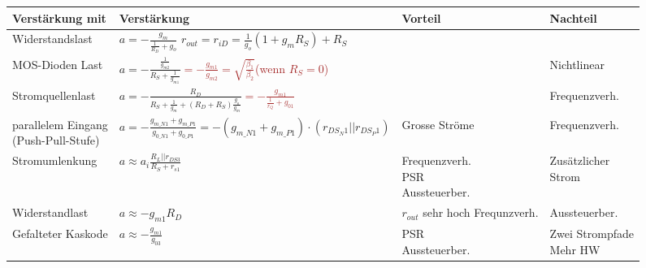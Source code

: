 \begin{tabular}{|l|l|l|l|}
    \hline
    \textbf{Verstärkung mit}  & \textbf{Verstärkung}  & \textbf{Vorteil} & \textbf{Nachteil} \\
    \hline 
    Widerstandslast & \makecell[l]{$a = -\frac{g_m}{\frac{1}{R_D}+g_o}$\\$r_{out} = r_{iD} = \frac{1}{g_o}(1+g_m R_S)+R_S$} & & \\
    \hline
    MOS-Dioden Last & $a = -\frac{\frac{1}{g_{m2}}}{R_S+\frac{1}{g_{m1}}}$\textcolor{brown}{$=-\frac{g_{m1}}{g_{m2}}= \sqrt{\frac{\beta_1}{\beta_2}}$(wenn $R_S = 0$)}& & Nichtlinear \\
    \hline
    Stromquellenlast & $a = -\frac{R_D}{R_S+\frac{1}{g_m}+(R_D+R_S)\frac{g_o}{g_m}}$\textcolor{brown}{$=-\frac{g_{m1}}{\frac{1}{r_Q}+g_{01}}$} & & Frequenzverh. \\
    \hline
    \makecell[l]{parallelem Eingang\\(Push-Pull-Stufe)} & $a= -\frac{g_{m\_N1}+g_{m\_P1}}{g_{0\_N1}+g_{0\_P1}}=-(g_{m\_N1}+g_{m\_P1})\cdot(r_{DS_N1}||r_{DS_P1})$ & Grosse Ströme & Frequenzverh. \\
    \hline
    Stromumlenkung & $a\approx a_i\frac{R_L||r_{DS3}}{R_S+r_{s1}}$ & \makecell[l]{Frequenzverh. \\PSR \\Aussteuerber.} & \makecell[l]{Zusätzlicher \\Strom} \\
    \hline
    Widerstandlast & $a\approx-g_{m1}R_D$ & \makecell[l]{$r_{out}$ sehr hoch \\Frequnzverh.} & Aussteuerber.\\
    \hline
    Gefalteter Kaskode & $a\approx -\frac{g_{m1}}{g_{03}}$& \makecell[l]{PSR \\Aussteuerber.} & \makecell[l]{Zwei Strompfade \\Mehr HW}\\
    \hline
\end{tabular}
